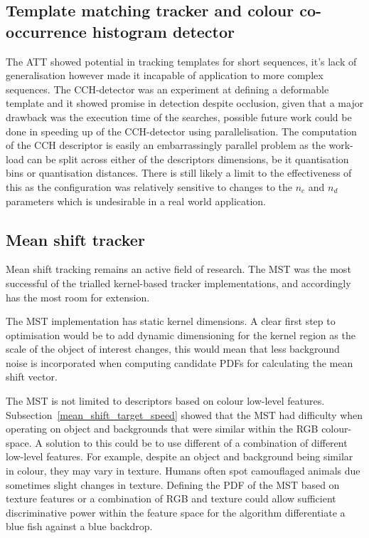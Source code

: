\subsection{Template matching tracker and colour co-occurrence histogram detector}\label{future_tmt}
The ATT showed potential in tracking templates for
short sequences, it's lack of generalisation however made it incapable of
application to more complex sequences. 
The CCH-detector was an experiment at defining a deformable template
and it showed promise in detection despite occlusion, given that a major
drawback was the execution time of the searches, possible future work could be
done in speeding up of the CCH-detector using parallelisation. The computation
of the CCH descriptor is easily an embarrassingly parallel problem as the
work-load can be split across either of the descriptors dimensions, be it
quantisation bins or quantisation distances. 
There is still likely a limit to the effectiveness of this as the configuration
was relatively sensitive to changes to the $n_c$ and $n_d$ parameters which is
undesirable in a real world application.

\subsection{Mean shift tracker}\label{future_mst}
Mean shift tracking remains an active field of research. The MST was the most
successful of the trialled kernel-based tracker implementations, and accordingly
has the most room for extension.

The MST implementation has static kernel dimensions. A clear first
step to optimisation would be to add dynamic dimensioning for the kernel region
as the scale of the object of interest changes, this would mean that less
background noise is incorporated when computing candidate PDFs for calculating
the mean shift vector.

The MST is not limited to descriptors based on colour low-level features.
Subsection~\ref{mean_shift_target_speed} showed that the MST had difficulty when operating on
object and backgrounds that were similar within the RGB colour-space. A solution
to this could be to use different of a combination of different low-level
features. For example, despite an object and background being similar in colour,
they may vary in texture. Humans often spot camouflaged animals due sometimes
slight changes in texture. 
Defining the PDF of the MST based on texture features or a combination of RGB
and texture could allow sufficient discriminative power within the feature space
for the algorithm differentiate a blue fish against a blue backdrop.

